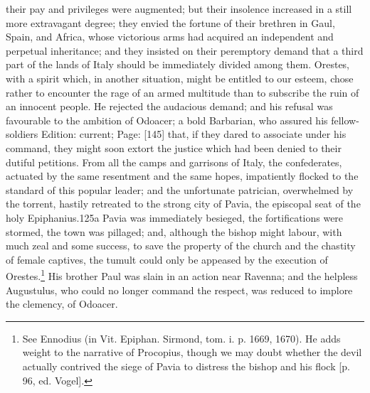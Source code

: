 their pay and privileges were augmented; but their insolence increased in a still more extravagant degree; they envied the fortune of their brethren in Gaul, Spain, and Africa, whose victorious arms had acquired an independent and perpetual inheritance; and they insisted on their peremptory demand that a third part of the lands of Italy should be immediately divided among them. Orestes, with a spirit which, in another situation, might be entitled to our esteem, chose rather to encounter the rage of an armed multitude than to subscribe the ruin of an innocent people. He rejected the audacious demand; and his refusal was favourable to the ambition of Odoacer; a bold Barbarian, who assured his fellow-soldiers Edition: current; Page: [145] that, if they dared to associate under his command, they might soon extort the justice which had been denied to their dutiful petitions. From all the camps and garrisons of Italy, the confederates, actuated by the same resentment and the same hopes, impatiently flocked to the standard of this popular leader; and the unfortunate patrician, overwhelmed by the torrent, hastily retreated to the strong city of Pavia, the episcopal seat of the holy Epiphanius.125a Pavia was immediately besieged, the fortifications were stormed, the town was pillaged; and, although the bishop might labour, with much zeal and some success, to save the property of the church and the chastity of female captives, the tumult could only be appeased by the execution of Orestes.\footnote{See Ennodius (in Vit. Epiphan. Sirmond, tom. i. p. 1669, 1670). He adds weight to the narrative of Procopius, though we may doubt whether the devil actually contrived the siege of Pavia to distress the bishop and his flock [p. 96, ed. Vogel].} His brother Paul was slain in an action near Ravenna; and the helpless Augustulus, who could no longer command the respect, was reduced to implore the clemency, of Odoacer.

